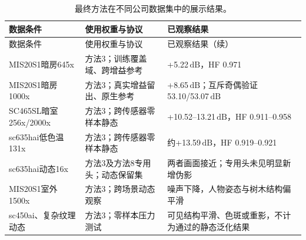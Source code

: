 \documentclass[11pt,a4paper,UTF8,fontset=fandol]{ctexart}
\newcommand{\db}{\ensuremath{\,\mathrm{dB}}}
\begin{document}
{\small
\begin{longtable}{P{0.26\textwidth}P{0.23\textwidth}P{0.40\textwidth}}
\caption{最终方法在不同公司数据集中的展示结果。}\label{tab:result_scope}\\
\toprule
数据条件 & 使用权重与协议 & 已观察结果 \\
\midrule
\endfirsthead
\toprule
数据条件 & 使用权重与协议 & 已观察结果（续） \\
\midrule
\endhead
\bottomrule
\endfoot
MIS20S1暗房645x & 方法3；训练覆盖域、跨增益参考 & +5.22\db，HF 0.971 \\
MIS20S1暗房1000x & 方法3；真实增益留出、原生参考 & +8.65\db；互斥奇偶验证53.10/53.07\db \\
SC465SL暗室256x/2000x & 方法3；跨传感器零样本静态 & +10.52--13.21\db，HF 0.911--0.958 \\
sc635hai低色温131x & 方法3；跨传感器零样本静态 & 约+13.59\db，HF 0.919--0.921 \\
sc635hai动态16x & 方法3及方法8专用头；动态保留集 & 两者画面接近；专用头未见明显新增伪影 \\
MIS20S1室外1500x & 方法3；跨场景动态观察 & 噪声下降，人物姿态与树木结构偏平滑 \\
sc450ai、复杂纹理动态 & 方法3；零样本压力测试 & 可见结构平滑、色斑或重影，不计为通过的静态泛化结果 \\
\end{longtable}
}

\FloatBarrier
\end{document}
